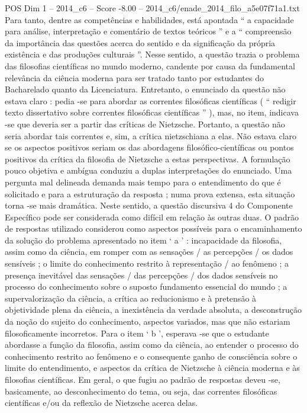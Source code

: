 \begin{textsample}{POS Dim 1 – 2014\_c6 – Score -8.00 – 2014\_c6/enade\_2014\_filo\_a5e07f71a1.txt}
Para tanto, dentre as competências e habilidades, está apontada “ a capacidade para análise, interpretação e comentário de textos teóricos ” e a “ compreensão da importância das questões acerca do sentido e da significação da própria existência e das produções culturais ”.
Nesse sentido, a questão trazia o problema das filosofias científicas no mundo moderno, candente por causa da fundamental relevância da ciência moderna para ser tratado tanto por estudantes do Bacharelado quanto da Licenciatura.
Entretanto, o enunciado da questão não estava claro : pedia -se para abordar as correntes filosóficas científicas ( “ redigir texto dissertativo sobre correntes filosóficas científicas ” ), mas, no item, indicava -se que deveria ser a partir das críticas de Nietzsche.
Portanto, a questão não seria abordar tais correntes e, sim, a crítica nietzschiana a elas.
Não estava claro se os aspectos positivos seriam os das abordagens filosófico-científicas ou pontos positivos da crítica da filosofia de Nietzsche a estas perspectivas.
A formulação pouco objetiva e ambígua conduziu a duplas interpretações do enunciado.
Uma pergunta mal delineada demanda mais tempo para o entendimento do que é solicitado e para a estruturação da resposta ; numa prova extensa, esta situação torna -se mais dramática.
Neste sentido, a questão discursiva 4 do Componente Específico pode ser considerada como difícil em relação às outras duas.
O padrão de respostas utilizado considerou como aspectos possíveis para o encaminhamento da solução do problema apresentado no item ‘ a ’ : incapacidade da filosofia, assim como da ciência, em romper com as sensações / as percepções / os dados sensíveis ; o limite do conhecimento restrito à representação / ao fenômeno ; a presença inevitável das sensações / das percepções / dos dados sensíveis no processo do conhecimento sobre o suposto fundamento essencial do mundo ; a supervalorização da ciência, a crítica ao reducionismo e à pretensão à objetividade plena da ciência, a inexistência da verdade absoluta, a desconstrução da noção do sujeito do conhecimento, aspectos variados, mas que não estariam filosoficamente incorretos.
Para o item ‘ b ’, esperava -se que o estudante abordasse a função da filosofia, assim como da ciência, ao entender o processo do conhecimento restrito ao fenômeno e o consequente ganho de consciência sobre o limite do entendimento, e aspectos da crítica de Nietzsche à ciência moderna e às filosofias científicas.
Em geral, o que fugiu ao padrão de respostas deveu -se, basicamente, ao desconhecimento do tema, ou seja, das correntes filosóficas científicas e/ou da reflexão de Nietzsche acerca delas.

\end{textsample}
